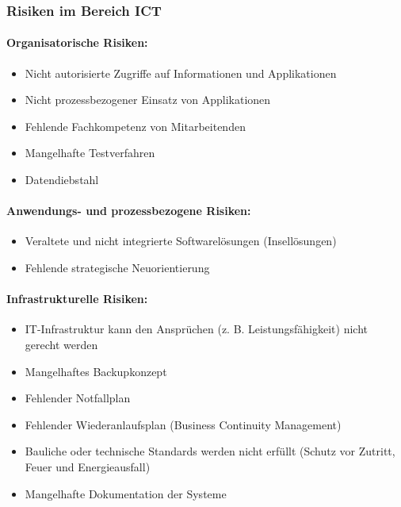 \documentclass[10pt,a4paper]{article}
\begin{document}
\subsubsection*{Risiken im Bereich ICT}

\paragraph*{Organisatorische Risiken:}
\begin{itemize}[noitemsep,topsep=0pt,leftmargin=*]
    \item Nicht autorisierte Zugriffe auf Informationen und
    Applikationen
    \item Nicht prozessbezogener Einsatz von Applikationen
    \item Fehlende Fachkompetenz von Mitarbeitenden
    \item Mangelhafte Testverfahren
    \item Datendiebstahl
\end{itemize}

\paragraph*{Anwendungs- und prozessbezogene Risiken:}
\begin{itemize}[noitemsep,topsep=0pt,leftmargin=*]
    \item Veraltete und nicht integrierte Softwarelösungen
    (Insellösungen)
    \item Fehlende strategische Neuorientierung
\end{itemize}

\paragraph*{Infrastrukturelle Risiken:}
\begin{itemize}[noitemsep,topsep=0pt,leftmargin=*]
    \item IT-Infrastruktur kann den Ansprüchen (z. B.
    Leistungsfähigkeit) nicht gerecht werden
    \item Mangelhaftes Backupkonzept
    \item Fehlender Notfallplan
    \item Fehlender Wiederanlaufsplan (Business Continuity
    Management)
    \item Bauliche oder technische Standards werden nicht erfüllt
    (Schutz vor Zutritt, Feuer und Energieausfall)
    \item Mangelhafte Dokumentation der Systeme
\end{itemize}
\end{document}
